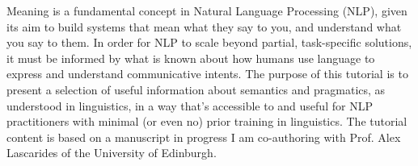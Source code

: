 Meaning is a fundamental concept in Natural Language Processing (NLP), given its aim to build systems that mean what they say to you, and understand what you say to them.  In order for NLP to scale beyond partial, task-specific solutions, it must be informed by what is known about how humans use language to express and understand communicative intents.  The purpose of this tutorial is to present a selection of useful information about semantics and pragmatics, as understood in linguistics, in a way that's accessible to and useful for NLP practitioners with minimal (or even no) prior training in linguistics.        The tutorial content is based on a manuscript in progress I am co-authoring with Prof. Alex Lascarides of the University of Edinburgh.
